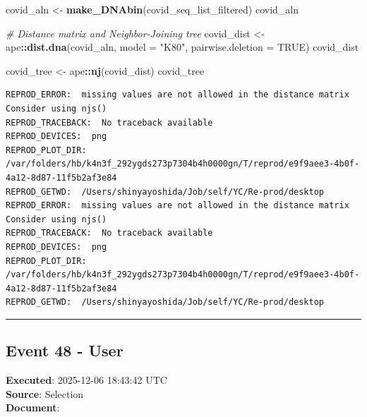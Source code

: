 \documentclass[
  11pt,
]{article}
\newenvironment{Shaded}{\begin{snugshade}}{\end{snugshade}}
\newcommand{\AttributeTok}[1]{\textcolor[rgb]{0.13,0.29,0.53}{#1}}
\newcommand{\CommentTok}[1]{\textcolor[rgb]{0.56,0.35,0.01}{\textit{#1}}}
\newcommand{\ConstantTok}[1]{\textcolor[rgb]{0.56,0.35,0.01}{#1}}
\newcommand{\FunctionTok}[1]{\textcolor[rgb]{0.13,0.29,0.53}{\textbf{#1}}}
\newcommand{\NormalTok}[1]{#1}
\newcommand{\OtherTok}[1]{\textcolor[rgb]{0.56,0.35,0.01}{#1}}
\newcommand{\SpecialCharTok}[1]{\textcolor[rgb]{0.81,0.36,0.00}{\textbf{#1}}}
\newcommand{\StringTok}[1]{\textcolor[rgb]{0.31,0.60,0.02}{#1}}
\newenvironment{rpoutput}{\vspace{0.5em}\begin{snugshade}}{\end{snugshade}}
\begin{document}
\begin{Shaded}
\begin{Highlighting}[]
\NormalTok{covid\_aln }\OtherTok{\textless{}{-}} \FunctionTok{make\_DNAbin}\NormalTok{(covid\_seq\_list\_filtered)}
\NormalTok{covid\_aln}

\CommentTok{\# Distance matrix and Neighbor{-}Joining tree}
\NormalTok{covid\_dist }\OtherTok{\textless{}{-}}\NormalTok{ ape}\SpecialCharTok{::}\FunctionTok{dist.dna}\NormalTok{(covid\_aln, }\AttributeTok{model =} \StringTok{"K80"}\NormalTok{, }\AttributeTok{pairwise.deletion =} \ConstantTok{TRUE}\NormalTok{)}
\NormalTok{covid\_dist}

\NormalTok{covid\_tree }\OtherTok{\textless{}{-}}\NormalTok{ ape}\SpecialCharTok{::}\FunctionTok{nj}\NormalTok{(covid\_dist)}
\NormalTok{covid\_tree}
\end{Highlighting}
\end{Shaded}

\begin{rpoutput}

\begin{verbatim}
REPROD_ERROR:  missing values are not allowed in the distance matrix
Consider using njs() 
REPROD_TRACEBACK:  No traceback available  
REPROD_DEVICES:  png 
REPROD_PLOT_DIR:  /var/folders/hb/k4n3f_292ygds273p7304b4h0000gn/T/reprod/e9f9aee3-4b0f-4a12-8d87-11f5b2af3e84 
REPROD_GETWD:  /Users/shinyayoshida/Job/self/YC/Re-prod/desktop 
REPROD_ERROR:  missing values are not allowed in the distance matrix
Consider using njs() 
REPROD_TRACEBACK:  No traceback available  
REPROD_DEVICES:  png 
REPROD_PLOT_DIR:  /var/folders/hb/k4n3f_292ygds273p7304b4h0000gn/T/reprod/e9f9aee3-4b0f-4a12-8d87-11f5b2af3e84 
REPROD_GETWD:  /Users/shinyayoshida/Job/self/YC/Re-prod/desktop 
\end{verbatim}

\end{rpoutput}

\begin{center}\rule{0.5\linewidth}{0.5pt}\end{center}

\subsection{Event 48 - User}\label{event-48---user}

\textbf{Executed}: 2025-12-06 18:43:42 UTC\\
\textbf{Source}: Selection\\
\textbf{Document}:
\end{document}
